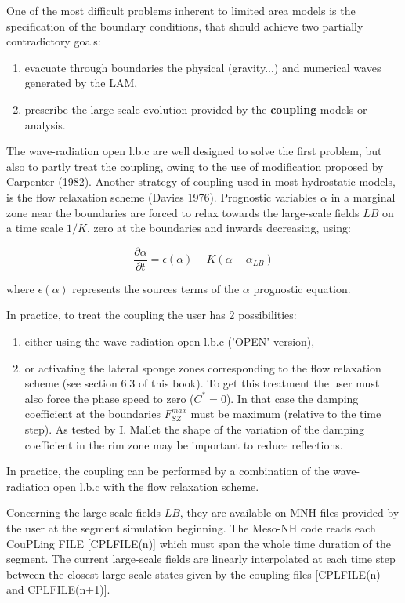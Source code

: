 One of the most difficult problems inherent to limited area models is the
specification of the boundary conditions, that should achieve
two partially contradictory goals:

\begin{enumerate}
\item evacuate through boundaries the physical (gravity...) and numerical
waves generated by the LAM,
\item prescribe the large-scale evolution provided by the {\bf coupling}
models or analysis.
\end{enumerate}

 The wave-radiation open l.b.c are well designed to solve the first problem,
but also to partly treat the coupling, owing to the use of modification proposed by
Carpenter (1982). Another strategy of coupling used in most hydrostatic models,
is the flow relaxation scheme (Davies 1976). Prognostic variables $\alpha$ in
a marginal zone near the boundaries are forced to relax towards the large-scale
fields $LB$ on a time scale $1/K$, zero at the boundaries and inwards decreasing,
using:

\begin{equation}
  \dfrac{\partial \alpha}{\partial t} =
 \epsilon (\alpha) - K (\alpha - \alpha_{LB})
\end{equation}

\noindent
where $\epsilon (\alpha)$ represents the sources terms of the $\alpha$ prognostic
equation.

 In practice, to treat the coupling the user has 2 possibilities:
\begin{enumerate}
\item either using the wave-radiation open l.b.c ('OPEN' version),
\item or activating the lateral sponge zones corresponding to the flow
relaxation scheme (see section 6.3 of this book). To get this treatment
the user must also force the phase speed to zero ($C^* = 0$).
 In that case the damping
coefficient at the boundaries $F_{SZ}^{max}$ must be maximum (relative to the
time step). As tested by I. Mallet the shape of the variation of the damping
coefficient in the rim zone may be important to reduce reflections.
\end{enumerate}

 In practice, the coupling can be performed by a combination of the
wave-radiation open l.b.c with the flow relaxation scheme.

 Concerning the large-scale fields $LB$, they are available on MNH files provided by
the user at the segment simulation beginning. The Meso-NH code reads each CouPLing
FILE [CPLFILE(n)] which must span the whole time duration of the segment.
The current large-scale fields are linearly interpolated at each
time step between the closest large-scale states given by the coupling files
[CPLFILE(n) and CPLFILE(n+1)].



